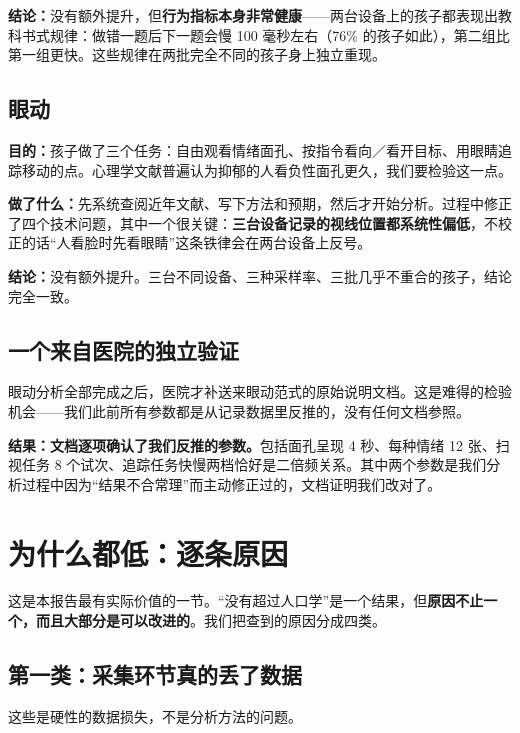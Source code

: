 \documentclass[UTF8,12pt,a4paper]{ctexart}
\newcommand{\key}[1]{\textbf{\textcolor{blue!45!black}{#1}}}
\begin{document}
\key{结论：}没有额外提升，但\key{行为指标本身非常健康}——两台设备上的孩子都表现出教科书式规律：做错一题后下一题会慢 100 毫秒左右（76\% 的孩子如此），第二组比第一组更快。这些规律在两批完全不同的孩子身上独立重现。

\subsection{眼动}

\key{目的：}孩子做了三个任务：自由观看情绪面孔、按指令看向／看开目标、用眼睛追踪移动的点。心理学文献普遍认为抑郁的人看负性面孔更久，我们要检验这一点。

\key{做了什么：}先系统查阅近年文献、写下方法和预期，然后才开始分析。过程中修正了四个技术问题，其中一个很关键：\key{三台设备记录的视线位置都系统性偏低}，不校正的话“人看脸时先看眼睛”这条铁律会在两台设备上反号。

\key{结论：}没有额外提升。三台不同设备、三种采样率、三批几乎不重合的孩子，结论完全一致。

\subsection{一个来自医院的独立验证}

眼动分析全部完成之后，医院才补送来眼动范式的原始说明文档。这是难得的检验机会——我们此前所有参数都是从记录数据里反推的，没有任何文档参照。

\key{结果：文档逐项确认了我们反推的参数。}包括面孔呈现 4 秒、每种情绪 12 张、扫视任务 8 个试次、追踪任务快慢两档恰好是二倍频关系。其中两个参数是我们分析过程中因为“结果不合常理”而主动修正过的，文档证明我们改对了。

\newpage
\section{为什么都低：逐条原因}\label{sec:why}

这是本报告最有实际价值的一节。“没有超过人口学”是一个结果，但\key{原因不止一个，而且大部分是可以改进的}。我们把查到的原因分成四类。

\subsection{第一类：采集环节真的丢了数据}

这些是硬性的数据损失，不是分析方法的问题。
\end{document}
